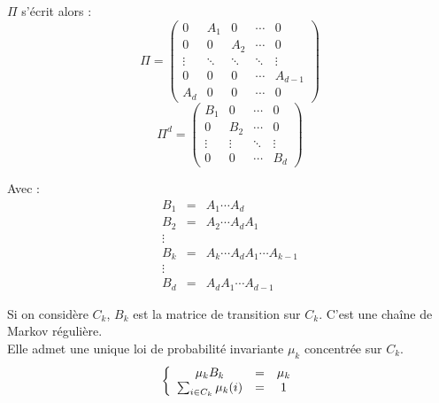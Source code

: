 $\Pi$ s'écrit alors :
\[\Pi=\begin{pmatrix} 0 & A_1 & 0 & \cdots & 0 \\
		      0 & 0 & A_2 & \cdots & 0 \\
		      \vdots & \ddots & \ddots & \ddots & \vdots \\
		      0 & 0 & 0 & \cdots & A_{d-1} \\
		      A_d & 0 & 0 & \cdots & 0 \end{pmatrix}\]
\[\Pi^d=\begin{pmatrix} B_1 & 0 & \cdots & 0 \\
			0 & B_2 & \cdots & 0 \\
			\vdots & \vdots & \ddots & \vdots \\
			0 & 0 & \cdots & B_d\end{pmatrix}\]

Avec : \begin{eqnarray*}
	B_1 &=& A_1 \cdots A_d \\
	B_2 &=& A_2 \cdots A_d A_1 \\
	\vdots \\
	B_k &=& A_k \cdots A_d A_1 \cdots A_{k-1} \\
	\vdots \\
	B_d &=& A_d A_1 \cdots A_{d-1}
\end{eqnarray*}

Si on considère $C_k$, $B_k$ est la matrice de transition sur $C_k$. C'est une chaîne de Markov régulière.\\
Elle admet une unique loi de probabilité invariante $\mu_k$ concentrée sur $C_k$. 
	\[\left\{ \begin{array}{c c c} \mu_k B_k &=& \mu_k \\ \sum_{i\in C_k} \mu_k(i) &=& 1 \end{array} \right.\]


